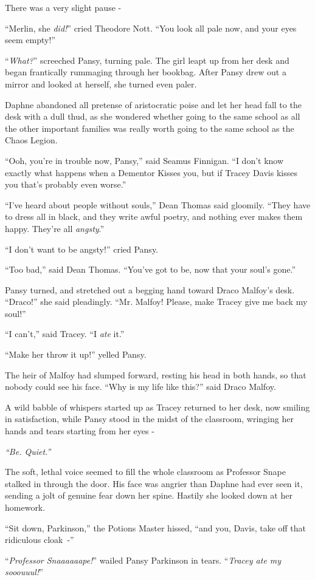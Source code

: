 There was a very slight pause -

``Merlin, she \emph{did!}'' cried Theodore Nott. ``You look all pale now, and your eyes seem empty!''

``\emph{What?}'' screeched Pansy, turning pale. The girl leapt up from her desk and began frantically rummaging through her bookbag. After Pansy drew out a mirror and looked at herself, she turned even paler.

Daphne abandoned all pretense of aristocratic poise and let her head fall to the desk with a dull thud, as she wondered whether going to the same school as all the other important families was really worth going to the same school as the Chaos Legion.

``Ooh, you're in trouble now, Pansy,'' said Seamus Finnigan. ``I don't know exactly what happens when a Dementor Kisses you, but if Tracey Davis kisses you that's probably even worse.''

``I've heard about people without souls,'' Dean Thomas said gloomily. ``They have to dress all in black, and they write awful poetry, and nothing ever makes them happy. They're all \emph{angsty}.''

``I don't want to be angsty!'' cried Pansy.

``Too bad,'' said Dean Thomas. ``You've got to be, now that your soul's gone.''

Pansy turned, and stretched out a begging hand toward Draco Malfoy's desk. ``Draco!'' she said pleadingly. ``Mr. Malfoy! Please, make Tracey give me back my soul!''

``I can't,'' said Tracey. ``I \emph{ate} it.''

``Make her throw it up!'' yelled Pansy.

The heir of Malfoy had slumped forward, resting his head in both hands, so that nobody could see his face. ``Why is my life like this?'' said Draco Malfoy.

A wild babble of whispers started up as Tracey returned to her desk, now smiling in satisfaction, while Pansy stood in the midst of the classroom, wringing her hands and tears starting from her eyes -

\emph{``Be. Quiet.''}

The soft, lethal voice seemed to fill the whole classroom as Professor Snape stalked in through the door. His face was angrier than Daphne had ever seen it, sending a jolt of genuine fear down her spine. Hastily she looked down at her homework.

``Sit down, Parkinson,'' the Potions Master hissed, ``and you, Davis, take off that ridiculous cloak~-''

``\emph{Professor Snaaaaaape!}'' wailed Pansy Parkinson in tears. ``\emph{Tracey ate my sooouuul!}''

